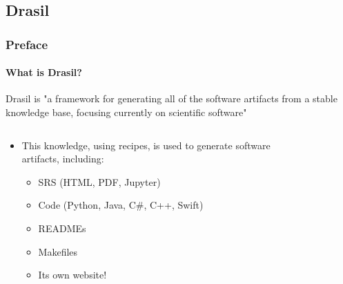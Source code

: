 \documentclass{beamer}
\begin{document}
\subsection{Drasil}

\begin{frame}
    \frametitle{Preface}
    \framesubtitle{What is Drasil?}
    Drasil is "a framework for generating all of the software
    artifacts from a stable knowledge base, focusing
    currently on scientific software" \cite{hunt_drasil_2021}
    \vspace{-2mm}
    \begin{columns}[T,onlytextwidth]
        \begin{column}{.5\textwidth}
            \vspace{2mm}
            \begin{minipage}{\textwidth}
                \begin{itemize}
                    \item<2-> This knowledge, using recipes, is used to generate
                        software artifacts, including:
                        \begin{itemize}
                            \item SRS (HTML, PDF, Jupyter)
                            \item Code (Python, Java, C\#, C++, Swift)
                            \item READMEs
                            \item Makefiles
                            \item Its own website\footnotemark[1]!
                        \end{itemize}
                \end{itemize}
            \end{minipage}
        \end{column}
        \begin{column}{.45\textwidth}
            \vspace{-4mm}
            \begin{figure}

\end{figure}
\end{column}
\end{columns}
\end{frame}
\end{document}
